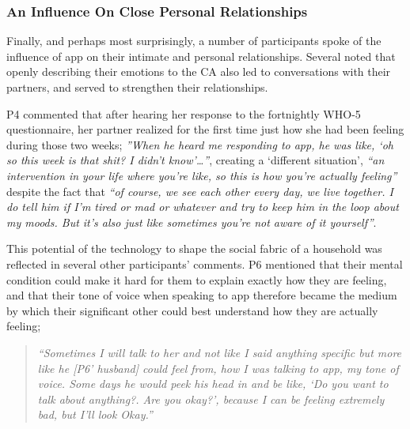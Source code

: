         \subsubsection{An Influence On Close Personal Relationships} %
        
            Finally, and perhaps most surprisingly, a number of participants spoke of the influence of \acl{app} on their intimate and personal relationships. Several noted that openly describing their emotions to the \ac{CA} also led to conversations with their partners, and served to strengthen their relationships.

            P4 commented that after hearing her response to the fortnightly \ac{WHO-5} questionnaire, her partner realized for the first time just how she had been feeling during those two weeks; \textit{''When he heard me responding to \acl{app}, he was like, `oh so this week is that shit? I didn't know'\ldots''}, creating a `different situation', \textit{``an intervention in your life where you're like, so this is how you're actually feeling''} despite the fact that \textit{``of course, we see each other every day, we live together. I do tell him if I'm tired or mad or whatever and try to keep him in the loop about my moods. But it's also just like sometimes you're not aware of it yourself''}.
            
            This potential of the technology to shape the social fabric of a household was reflected in several other participants' comments. P6 mentioned that their mental condition could make it hard for them to explain exactly how they are feeling, and that their tone of voice when speaking to \acl{app} therefore became the medium by which their significant other could best understand how they are actually feeling;
            
                \begin{quote}
                \vspace{2mm}
                    \textit{``Sometimes I will talk to her and not like I said anything specific but more like he [P6' husband] could feel from, how I was talking to \acl{app}, my tone of voice. Some days he would peek his head in and be like, `Do you want to talk about anything?. Are you okay?', because I can be feeling extremely bad, but I'll look Okay.''}
                \vspace{2mm}
                \end{quote} 

